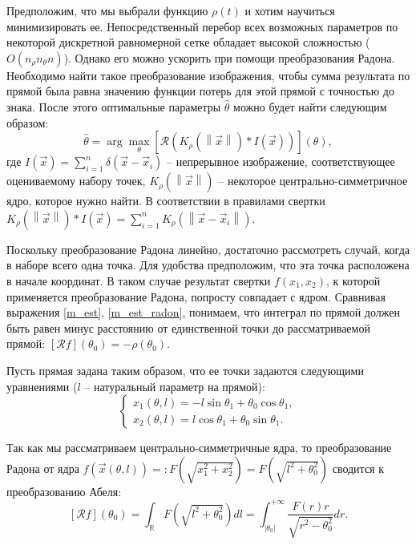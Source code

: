 Предположим, что мы выбрали функцию $\rho(t)$ и хотим научиться минимизировать ее.
Непосредственный перебор всех возможных параметров по некоторой дискретной равномерной сетке обладает высокой сложностью ($O\left( n_\rho n_\theta n \right)$).
Однако его можно ускорить при помощи преобразования Радона.
Необходимо найти такое преобразование изображения, чтобы сумма результата по прямой была равна значению функции потерь для этой прямой с точностью до знака.
После этого оптимальные параметры $\hat\theta$ можно будет найти следующим образом:
\begin{equation}
\label{m_est_radon}
    \hat\theta = \arg\max_{\theta} \left[ \mathcal{R} \left( K_{\rho}\left( \left\| \vec x \right\| \right) * I\left( \vec x \right) \right) \right]\left( \theta \right),
\end{equation}
где $I\left( \vec x \right) = \sum_{i=1}^n \delta\left( \vec x - \vec x_i \right)$ -- непрерывное изображение, соответствующее оцениваемому набору точек, $K_{\rho}\left( \left\| \vec x \right\| \right)$ -- некоторое центрально-симметричное ядро, которое нужно найти.
В соответствии в правилами свертки $K_{\rho}\left( \left\| \vec x \right\| \right) * I\left( \vec x \right) = \sum_{i=1}^n K_\rho\left( \left\| \vec x - \vec x_i \right\| \right)$.

Поскольку преобразование Радона линейно, достаточно рассмотреть случай, когда в наборе всего одна точка.
Для удобства предположим, что эта точка расположена в начале координат.
В таком случае результат свертки $f(x_1, x_2)$, к которой применяется преобразование Радона, попросту совпадает с ядром.
Сравнивая выражения \eqref{m_est}, \eqref{m_est_radon}, понимаем, что интеграл по прямой должен быть равен минус расстоянию от единственной точки до рассматриваемой прямой: $\left[ \mathcal{R}f \right]\left( \theta_0 \right) = -\rho\left( \theta_0 \right)$.

Пусть прямая задана таким образом, что ее точки задаются следующими уравнениями ($l$ -- натуральный параметр на прямой):
\begin{equation*}
    \begin{cases}
        x_1(\theta, l) = -l \sin\theta_1 + \theta_0 \cos\theta_1,\\
        x_2(\theta, l) =  l \cos\theta_1 + \theta_0 \sin\theta_1.
    \end{cases}
\end{equation*}

Так как мы рассматриваем центрально-симметричные ядра, то преобразование Радона от ядра $f\left( \vec x\left( \theta, l \right) \right) =: F\left( \sqrt{x_1^2 + x_2^2} \right) = F\left( \sqrt{l^2 + \theta_0^2} \right)$ сводится к преобразованию Абеля:
\begin{equation*}
    \left[ \mathcal{R}f \right]\left( \theta_0 \right) =
    \int_{\mathbb{R}} F\left( \sqrt{l^2 + \theta_0^2} \right) dl =
    \int_{|\theta_0|}^{+\infty} \frac{F(r)r}{\sqrt{r^2 - \theta_0^2}} dr.
\end{equation*}

